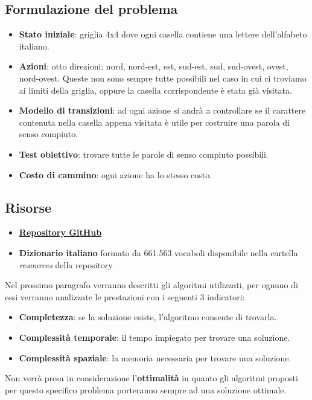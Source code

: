 \documentclass[10pt,a4paper]{article}
\begin{document}
	\subsection{Formulazione del problema}
	\begin{itemize}
		\item \textbf{Stato iniziale}: griglia 4x4 dove ogni casella contiene una lettere dell'alfabeto italiano.
		\item \textbf{Azioni}: otto direzioni: nord, nord-est, est, sud-est, sud, sud-ovest, ovest, nord-ovest. Queste non sono sempre tutte possibili nel caso in cui ci troviamo ai limiti della griglia, oppure la casella corrispondente è stata già visitata.
		\item \textbf{Modello di transizioni}: ad ogni azione si andrà a controllare se il carattere contenuta nella casella appena visitata è utile per costruire una parola di senso compiuto.
		\item \textbf{Test obiettivo}: trovare tutte le parole di senso compiuto possibili.
		\item\textbf{Costo di cammino}: ogni azione ha lo stesso costo.
	\end{itemize}
	\subsection{Risorse}
	\begin{itemize}
		\item \href{https://github.com/RazzoloDevs/Razzolo}{\textbf{Repository GitHub}}
		\item \textbf{Dizionario italiano} formato da 661.563 vocaboli disponibile nella cartella \textit{resources} della repository
	\end{itemize}
	Nel prossimo paragrafo verranno descritti gli algoritmi utilizzati, per ognuno di essi verranno analizzate le prestazioni con i seguenti 3 indicatori:
	\begin{itemize}
		\item \textbf{Completezza}: se la soluzione esiste, l'algoritmo consente di trovarla.
		\item \textbf{Complessità temporale}: il tempo impiegato per trovare una soluzione.
		\item \textbf{Complessità spaziale}: la memoria necessaria per trovare una soluzione.
	\end{itemize}
	Non verrà presa in considerazione l'\textbf{ottimalità} in quanto gli algoritmi proposti per questo specifico problema porteranno sempre ad una soluzione ottimale.
	\newpage
\end{document}
